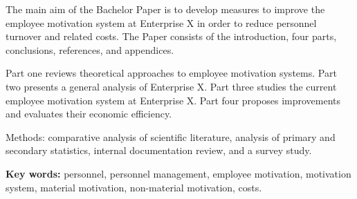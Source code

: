 \frontmatterpage
{}
The main aim of the Bachelor Paper is to develop measures to improve the employee motivation system at Enterprise X in order to reduce personnel turnover and related costs. The Paper consists of the introduction, four parts, conclusions, references, and appendices.

Part one reviews theoretical approaches to employee motivation systems.
Part two presents a general analysis of Enterprise X.
Part three studies the current employee motivation system at Enterprise X.
Part four proposes improvements and evaluates their economic efficiency.

Methods: comparative analysis of scientific literature, analysis of primary and secondary statistics, internal documentation review, and a survey study.

\textbf{Key words:} personnel, personnel management, employee motivation, motivation system, material motivation, non-material motivation, costs.
